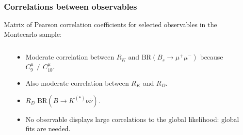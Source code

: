 \documentclass[mathserif, 10pt, dvipsnames]{beamer}
\begin{document}
\begin{frame}\frametitle{Correlations between observables}
    Matrix of Pearson correlation coefficients for selected observables in the Montecarlo sample:
    \begin{columns}[onlytextwidth]
        \begin{column}{0.6\textwidth}

        \end{column}
        \begin{column}{0.4\textwidth}
            \begin{itemize}
                \item Moderate correlation between $R_K$ and $\mathrm{BR}(B_s \to \mu^+ \mu^-)$ because $C_9^\mu \neq C_{10}^\mu$.
                \item Also moderate correlation between $R_K$ and $R_D$.
                \item {\color{OliveGreen}{Perfect correlation between} $R_D$
                      $\mathrm{BR}(B\to K^{(*)}\nu\bar{\nu})$}.
                \item No observable displays large correlations to the global likelihood: global fits are needed.
            \end{itemize}
        \end{column}
    \end{columns}

\end{frame}
\end{document}
